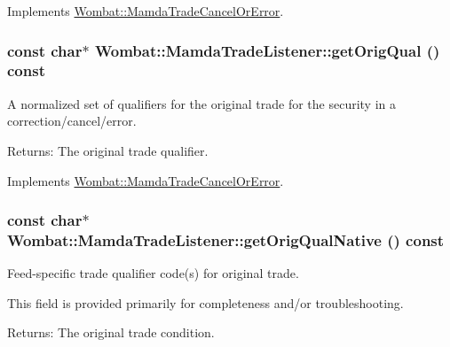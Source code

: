 Implements \hyperlink{classWombat_1_1MamdaTradeCancelOrError_081cabbd540153e1d7ac93b927ff3542}{Wombat::Mamda\-Trade\-Cancel\-Or\-Error}.\hypertarget{classWombat_1_1MamdaTradeListener_65563a27266a0f48eff3f44b5a4216b7}{
\subsubsection[getOrigQual]{\setlength{\rightskip}{0pt plus 5cm}const char$\ast$ Wombat::Mamda\-Trade\-Listener::get\-Orig\-Qual () const}}
\label{classWombat_1_1MamdaTradeListener_65563a27266a0f48eff3f44b5a4216b7}


A normalized set of qualifiers for the original trade for the security in a correction/cancel/error. 

\begin{Desc}
\item[Returns:]The original trade qualifier. \end{Desc}


Implements \hyperlink{classWombat_1_1MamdaTradeCancelOrError_970107e24e85f02515bc3d5ae182aafc}{Wombat::Mamda\-Trade\-Cancel\-Or\-Error}.\hypertarget{classWombat_1_1MamdaTradeListener_3d7a8290418015b6f8e1bc2e412225b1}{
\subsubsection[getOrigQualNative]{\setlength{\rightskip}{0pt plus 5cm}const char$\ast$ Wombat::Mamda\-Trade\-Listener::get\-Orig\-Qual\-Native () const}}
\label{classWombat_1_1MamdaTradeListener_3d7a8290418015b6f8e1bc2e412225b1}


Feed-specific trade qualifier code(s) for original trade. 

This field is provided primarily for completeness and/or troubleshooting.

\begin{Desc}
\item[Returns:]The original trade condition. \end{Desc}


